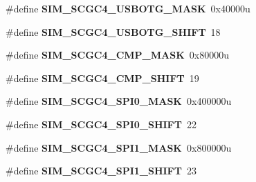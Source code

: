 \begin{DoxyCompactItemize}
\item 
\hypertarget{group___s_i_m___register___masks_ga136bfa98e3aafded899c9806d5410d4d}{}\#define {\bfseries S\+I\+M\+\_\+\+S\+C\+G\+C4\+\_\+\+U\+S\+B\+O\+T\+G\+\_\+\+M\+A\+S\+K}~0x40000u\label{group___s_i_m___register___masks_ga136bfa98e3aafded899c9806d5410d4d}

\item 
\hypertarget{group___s_i_m___register___masks_ga5d0dd9f68667fdf71fce1b0a6ae990dd}{}\#define {\bfseries S\+I\+M\+\_\+\+S\+C\+G\+C4\+\_\+\+U\+S\+B\+O\+T\+G\+\_\+\+S\+H\+I\+F\+T}~18\label{group___s_i_m___register___masks_ga5d0dd9f68667fdf71fce1b0a6ae990dd}

\item 
\hypertarget{group___s_i_m___register___masks_gad7304bdb8fc46deb77c5e444e56fae40}{}\#define {\bfseries S\+I\+M\+\_\+\+S\+C\+G\+C4\+\_\+\+C\+M\+P\+\_\+\+M\+A\+S\+K}~0x80000u\label{group___s_i_m___register___masks_gad7304bdb8fc46deb77c5e444e56fae40}

\item 
\hypertarget{group___s_i_m___register___masks_ga1072a5419bbeaf4081c6c4a5ca7cf86c}{}\#define {\bfseries S\+I\+M\+\_\+\+S\+C\+G\+C4\+\_\+\+C\+M\+P\+\_\+\+S\+H\+I\+F\+T}~19\label{group___s_i_m___register___masks_ga1072a5419bbeaf4081c6c4a5ca7cf86c}

\item 
\hypertarget{group___s_i_m___register___masks_ga0b29e4c88f0494317c3cd447fb363f5e}{}\#define {\bfseries S\+I\+M\+\_\+\+S\+C\+G\+C4\+\_\+\+S\+P\+I0\+\_\+\+M\+A\+S\+K}~0x400000u\label{group___s_i_m___register___masks_ga0b29e4c88f0494317c3cd447fb363f5e}

\item 
\hypertarget{group___s_i_m___register___masks_ga4fd9f9a3ee78e060c7042597043c336c}{}\#define {\bfseries S\+I\+M\+\_\+\+S\+C\+G\+C4\+\_\+\+S\+P\+I0\+\_\+\+S\+H\+I\+F\+T}~22\label{group___s_i_m___register___masks_ga4fd9f9a3ee78e060c7042597043c336c}

\item 
\hypertarget{group___s_i_m___register___masks_ga40dc8e1653911d8e12103bc4ef9d66d1}{}\#define {\bfseries S\+I\+M\+\_\+\+S\+C\+G\+C4\+\_\+\+S\+P\+I1\+\_\+\+M\+A\+S\+K}~0x800000u\label{group___s_i_m___register___masks_ga40dc8e1653911d8e12103bc4ef9d66d1}

\item 
\hypertarget{group___s_i_m___register___masks_ga0bc6038c3a8a17fec28bc6980ad293e4}{}\#define {\bfseries S\+I\+M\+\_\+\+S\+C\+G\+C4\+\_\+\+S\+P\+I1\+\_\+\+S\+H\+I\+F\+T}~23\label{group___s_i_m___register___masks_ga0bc6038c3a8a17fec28bc6980ad293e4}


\end{DoxyCompactItemize}
